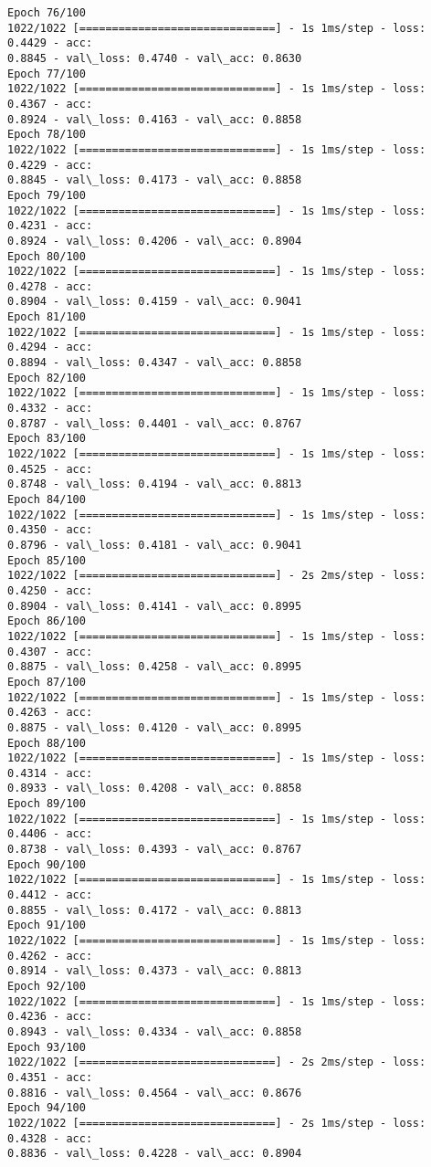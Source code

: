 \documentclass[11pt]{article}
\begin{document}
\begin{Verbatim}[commandchars=\\\{\}]
Epoch 76/100
1022/1022 [==============================] - 1s 1ms/step - loss: 0.4429 - acc:
0.8845 - val\_loss: 0.4740 - val\_acc: 0.8630
Epoch 77/100
1022/1022 [==============================] - 1s 1ms/step - loss: 0.4367 - acc:
0.8924 - val\_loss: 0.4163 - val\_acc: 0.8858
Epoch 78/100
1022/1022 [==============================] - 1s 1ms/step - loss: 0.4229 - acc:
0.8845 - val\_loss: 0.4173 - val\_acc: 0.8858
Epoch 79/100
1022/1022 [==============================] - 1s 1ms/step - loss: 0.4231 - acc:
0.8924 - val\_loss: 0.4206 - val\_acc: 0.8904
Epoch 80/100
1022/1022 [==============================] - 1s 1ms/step - loss: 0.4278 - acc:
0.8904 - val\_loss: 0.4159 - val\_acc: 0.9041
Epoch 81/100
1022/1022 [==============================] - 1s 1ms/step - loss: 0.4294 - acc:
0.8894 - val\_loss: 0.4347 - val\_acc: 0.8858
Epoch 82/100
1022/1022 [==============================] - 1s 1ms/step - loss: 0.4332 - acc:
0.8787 - val\_loss: 0.4401 - val\_acc: 0.8767
Epoch 83/100
1022/1022 [==============================] - 1s 1ms/step - loss: 0.4525 - acc:
0.8748 - val\_loss: 0.4194 - val\_acc: 0.8813
Epoch 84/100
1022/1022 [==============================] - 1s 1ms/step - loss: 0.4350 - acc:
0.8796 - val\_loss: 0.4181 - val\_acc: 0.9041
Epoch 85/100
1022/1022 [==============================] - 2s 2ms/step - loss: 0.4250 - acc:
0.8904 - val\_loss: 0.4141 - val\_acc: 0.8995
Epoch 86/100
1022/1022 [==============================] - 1s 1ms/step - loss: 0.4307 - acc:
0.8875 - val\_loss: 0.4258 - val\_acc: 0.8995
Epoch 87/100
1022/1022 [==============================] - 1s 1ms/step - loss: 0.4263 - acc:
0.8875 - val\_loss: 0.4120 - val\_acc: 0.8995
Epoch 88/100
1022/1022 [==============================] - 1s 1ms/step - loss: 0.4314 - acc:
0.8933 - val\_loss: 0.4208 - val\_acc: 0.8858
Epoch 89/100
1022/1022 [==============================] - 1s 1ms/step - loss: 0.4406 - acc:
0.8738 - val\_loss: 0.4393 - val\_acc: 0.8767
Epoch 90/100
1022/1022 [==============================] - 1s 1ms/step - loss: 0.4412 - acc:
0.8855 - val\_loss: 0.4172 - val\_acc: 0.8813
Epoch 91/100
1022/1022 [==============================] - 1s 1ms/step - loss: 0.4262 - acc:
0.8914 - val\_loss: 0.4373 - val\_acc: 0.8813
Epoch 92/100
1022/1022 [==============================] - 1s 1ms/step - loss: 0.4236 - acc:
0.8943 - val\_loss: 0.4334 - val\_acc: 0.8858
Epoch 93/100
1022/1022 [==============================] - 2s 2ms/step - loss: 0.4351 - acc:
0.8816 - val\_loss: 0.4564 - val\_acc: 0.8676
Epoch 94/100
1022/1022 [==============================] - 2s 1ms/step - loss: 0.4328 - acc:
0.8836 - val\_loss: 0.4228 - val\_acc: 0.8904

\end{Verbatim}
\end{document}
